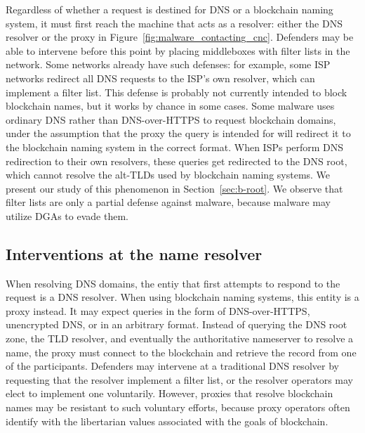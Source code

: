 Regardless of whether a request is destined for DNS or a 
blockchain naming 
system, it must first reach the machine that acts as a 
resolver: either the DNS 
resolver or the proxy in 
Figure~\ref{fig:malware_contacting_cnc}. Defenders may 
be able to intervene before this point by placing middleboxes 
with filter lists 
in the network. Some networks already have such defenses: for 
example, some ISP 
networks redirect all DNS requests to the ISP's own resolver, 
which can 
implement a filter list. This defense is probably not 
currently intended to 
block blockchain names, but it works by chance in some cases. 
Some malware uses 
ordinary DNS rather than DNS-over-HTTPS to request blockchain 
domains, under 
the assumption that the proxy the query is intended for will 
redirect it to the 
blockchain naming system in the correct format. When ISPs 
perform DNS 
redirection to their own resolvers, these queries get 
redirected to the DNS 
root, which cannot resolve the alt-TLDs used by blockchain naming systems. We 
present our study of this phenomenon in Section~\ref{sec:b-root}. We observe 
that filter lists are only a partial defense against malware, because malware 
may utilize DGAs to evade them. 

\subsection{Interventions at the name resolver}

When resolving DNS domains, the entiy that first attempts to 
respond to the request is a DNS resolver. When using 
blockchain naming systems, this entity is a proxy instead. It 
may expect queries in 
the form of DNS-over-HTTPS, unencrypted DNS, or in an 
arbitrary format. Instead of querying the DNS root zone, the 
TLD resolver, and eventually the authoritative nameserver to 
resolve a name, the proxy must connect to the blockchain and 
retrieve the record from one of the participants.
Defenders may intervene at a traditional DNS resolver by requesting that the 
resolver implement a filter list, or the resolver operators may elect to 
implement one voluntarily. However, proxies that resolve blockchain names may 
be resistant to such voluntary efforts, because proxy 
operators often identify with the libertarian values 
associated with the goals of blockchain. 


